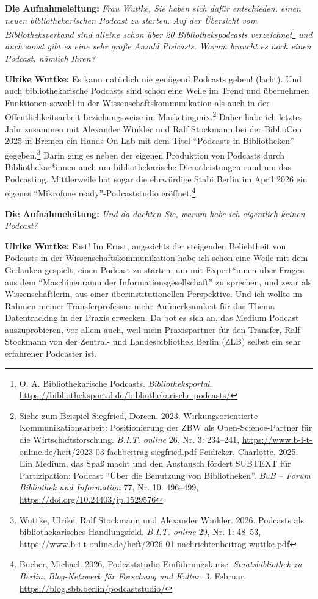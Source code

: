 \documentclass[a4paper,
fontsize=11pt,
oneside,
numbers=noperiodatend,
parskip=half-,
bibliography=totoc,
final
]{scrartcl}
\begin{document}
\textbf{Die Aufnahmeleitung:} \emph{Frau Wuttke, Sie haben sich dafür
entschieden, einen neuen bibliothekarischen Podcast zu starten. Auf der
Übersicht vom Bibliotheksverband sind alleine schon über 20
Bibliothekspodcasts verzeichnet}\footnote{O. A. Bibliothekarische
  Podcasts. \emph{Bibliotheksportal}.
  \url{https://bibliotheksportal.de/bibliothekarische-podcasts/}}
\emph{und auch sonst gibt es eine sehr große Anzahl Podcasts. Warum
braucht es noch einen Podcast, nämlich Ihren?}

\textbf{Ulrike Wuttke:} Es kann natürlich nie genügend Podcasts geben!
(lacht). Und auch bibliothekarische Podcasts sind schon eine Weile im
Trend und übernehmen Funktionen sowohl in der Wissenschaftskommunikation
als auch in der Öffentlichkeitsarbeit beziehungsweise im
Marketingmix.\footnote{Siehe zum Beispiel Siegfried, Doreen. 2023.
  Wirkungsorientierte Kommunikationsarbeit: Positionierung der ZBW als
  Open-Science-Partner für die Wirtschaftsforschung. \emph{B.I.T.
  online} 26, Nr. 3: 234--241,
  \url{https://www.b-i-t-online.de/heft/2023-03-fachbeitrag-siegfried.pdf}
  Feidicker, Charlotte. 2025. Ein Medium, das Spaß macht und den
  Austausch fördert SUBTEXT für Partizipation: Podcast \enquote{Über die
  Benutzung von Bibliotheken}. \emph{BuB -- Forum Bibliothek und
  Information} 77, Nr. 10: 496--499,
  \url{https://doi.org/10.24403/jp.1529576}} Daher habe ich letztes Jahr
zusammen mit Alexander Winkler und Ralf Stockmann bei der BiblioCon 2025
in Bremen ein Hands-On-Lab mit dem Titel \enquote{Podcasts in
Bibliotheken} gegeben.\footnote{Wuttke, Ulrike, Ralf Stockmann und
  Alexander Winkler. 2026. Podcasts als bibliothekarisches
  Handlungsfeld. \emph{B.I.T. online} 29, Nr. 1: 48--53,
  \url{https://www.b-i-t-online.de/heft/2026-01-nachrichtenbeitrag-wuttke.pdf}}
Darin ging es neben der eigenen Produktion von Podcasts durch
Bibliothekar*innen auch um bibliothekarische Dienstleistungen rund um
das Podcasting. Mittlerweile hat sogar die ehrwürdige Stabi Berlin im
April 2026 ein eigenes \enquote{Mikrofone ready}-Podcaststudio
eröffnet.\footnote{Bucher, Michael. 2026. Podcaststudio
  Einführungskurse. \emph{Staatsbibliothek zu Berlin: Blog-Netzwerk für
  Forschung und Kultur}. 3. Februar.
  \url{https://blog.sbb.berlin/podcaststudio/}}

\textbf{Die Aufnahmeleitung:} \emph{Und da dachten Sie, warum habe ich
eigentlich keinen Podcast?}

\textbf{Ulrike Wuttke:} Fast! Im Ernst, angesichts der steigenden
Beliebtheit von Podcasts in der Wissenschaftskommunikation habe ich
schon eine Weile mit dem Gedanken gespielt, einen Podcast zu starten, um
mit Expert*innen über Fragen aus dem \enquote{Maschinenraum der
Informationsgesellschaft} zu sprechen, und zwar als Wissenschaftlerin,
aus einer überinstitutionellen Perspektive. Und ich wollte im Rahmen
meiner Transferprofessur mehr Aufmerksamkeit für das Thema Datentracking
in der Praxis erwecken. Da bot es sich an, das Medium Podcast
auszuprobieren, vor allem auch, weil mein Praxispartner für den
Transfer, Ralf Stockmann von der Zentral- und Landesbibliothek Berlin
(ZLB) selbst ein sehr erfahrener Podcaster ist.
\end{document}
